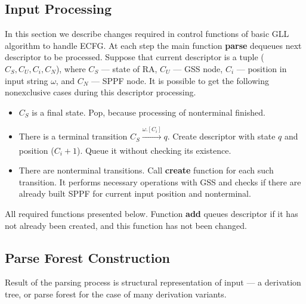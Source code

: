 \documentclass[runningheads,a4paper]{llncs}
\begin{document}
\subsection{Input Processing}%

In this section we describe changes required in control functions of basic GLL algorithm to handle ECFG.
At each step the main function \textbf{parse} dequeues next descriptor to be processed.
Suppose that current descriptor is a tuple ($C_S, C_U, C_i, C_N$), where $C_S$ --- state of RA, $C_U$ --- GSS node, $C_i$ --- position in input string $\omega$, and $C_N$ --- SPPF node. 
It is possible to get the following nonexclusive cases during this descriptor processing.

\begin{itemize} 
\item $C_S$ is a final state. Pop, because processing of nonterminal finished.
\item There is a terminal transition $C_S \xrightarrow[]{\omega.[C_i]} q$. 
Create descriptor with state $ q $ and position ($ C_i + 1 $).
Queue it without checking its existence.
\item There are nonterminal transitions. Call \textbf{create} function for
each such transition.
It performs necessary operations with GSS and checks if there are already built SPPF for current
input position and nonterminal.
\end{itemize}

All required functions presented below.
Function \textbf{add} queues descriptor if it has not already been created, and this function has not been changed.










\subsection{Parse Forest Construction}

Result of the parsing process is structural representation of input --- a derivation tree, or parse forest for the case of many derivation variants.
\end{document}
